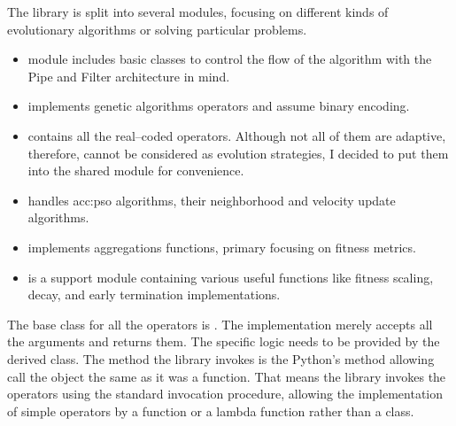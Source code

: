 The library is split into several modules, focusing on different kinds of evolutionary algorithms or solving particular problems.
\begin{itemize}
    \item {} module includes basic classes to control the flow of the algorithm with the Pipe and Filter architecture in mind.
    \item {} implements genetic algorithms operators and assume binary encoding.
    \item {} contains all the real--coded operators. Although not all of them are adaptive, therefore, cannot be considered as evolution strategies, I decided to put them into the shared module for convenience.
    \item {} handles \acrlong{acc:pso} algorithms, their neighborhood and velocity update algorithms.
    \item {} implements aggregations functions, primary focusing on fitness metrics.
    \item {} is a support module containing various useful functions like fitness scaling, decay, and early termination implementations.
\end{itemize}

The base class for all the operators is . The implementation merely accepts all the arguments and returns them. The specific logic needs to be provided by the derived class. The method the library invokes is the Python's  method allowing call the object the same as it was a function. That means the library invokes the operators using the standard invocation procedure, allowing the implementation of simple operators by a function or a lambda function rather than a class.

